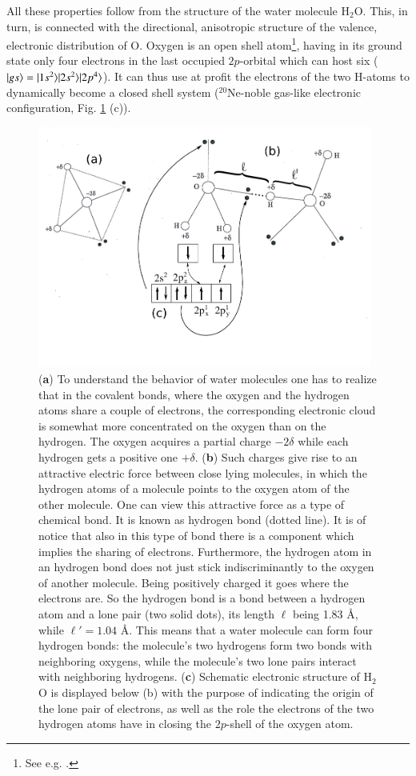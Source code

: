 \begin{subappendices}
All these properties follow from the structure of the water molecule H$_2$O. This, in turn, is connected with the directional, anisotropic structure of the valence, electronic distribution of O. Oxygen is an open shell atom\footnote{See e.g. \cite{Greiner:98}.}, having in its ground state only four electrons in the last occupied $2p$-orbital which can host six ($|{gs} \rangle=|{1s^2} \rangle|{2s^2} \rangle|{2p^4} \rangle$). It can thus use at profit the electrons of the two H-atoms to dynamically become a closed shell system ($^{20}$Ne-noble gas-like electronic configuration, Fig. \ref{fig6G5} (c)). 
\begin{figure}
\centerline{\includegraphics[width=11cm]{C8/figsC8/fig6G5.pdf}}
\caption{(\textbf{a}) To understand the behavior of water molecules one has to realize that in the covalent bonds, where the oxygen and the hydrogen atoms share a couple of electrons, the corresponding electronic cloud is somewhat more concentrated on the oxygen than on the hydrogen. The oxygen acquires a partial charge $-2\delta$ while each hydrogen gets a positive one $+\delta$. (\textbf{b}) Such charges give rise to an attractive electric force between  close lying molecules, in which the hydrogen atoms of a molecule points to the oxygen atom of the other molecule. One can view this attractive force as a type of chemical bond. It is known as hydrogen bond (dotted line). It is of notice that also in this type of bond there is a component which implies the sharing of electrons. Furthermore, the hydrogen atom in an hydrogen bond does not just stick indiscriminantly to the  oxygen of another molecule. Being positively charged it goes where the electrons are. So the hydrogen bond is a bond between a hydrogen atom and a lone pair (two solid dots), its length $\ell$ being 1.83 \AA, while $\ell'=1.04$ \AA. This means that a water molecule can form four hydrogen bonds: the molecule's two hydrogens form two bonds with neighboring oxygens, while the molecule's two lone pairs interact with neighboring hydrogens. (\textbf{c}) Schematic electronic structure of H$_2$O is displayed below (b) with the purpose of indicating  the origin of the lone pair of electrons, as well as the role the electrons of the two hydrogen atoms have in closing the $2p$-shell of the oxygen atom.}\label{fig6G5}

\end{figure}
\end{subappendices}
